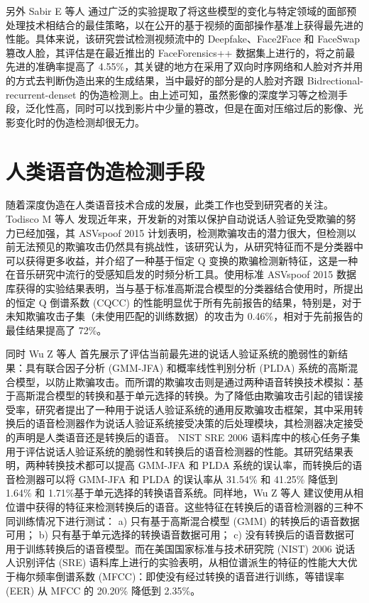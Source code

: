 另外 Sabir E 等人 \cite{sabir2019recurrent} 通过广泛的实验提取了将这些模型的变化与特定领域的面部预处理技术相结合的最佳策略，以在公开的基于视频的面部操作基准上获得最先进的性能。具体来说，该研究尝试检测视频流中的 Deepfake、Face2Face 和 FaceSwap 篡改人脸，其评估是在最近推出的 FaceForensics++ 数据集上进行的，将之前最先进的准确率提高了 4.55\%，其关键的地方在采用了双向时序网络和人脸对齐并用的方式去判断伪造出来的生成结果，当中最好的部分是的人脸对齐跟 Bidrectional-recurrent-denset 的伪造检测上。由上述可知，虽然影像的深度学习等之检测手段，泛化性高，同时可以找到影片中少量的篡改，但是在面对压缩过后的影像、光影变化时的伪造检测却很无力。

\section{人类语音伪造检测手段}

随着深度伪造在人类语音技术合成的发展，此类工作也受到研究者的关注。 Todisco M 等人 \cite{todisco2016new} 发现近年来，开发新的对策以保护自动说话人验证免受欺骗的努力已经加强，其 ASVspoof 2015 计划表明，检测欺骗攻击的潜力很大，但检测以前无法预见的欺骗攻击仍然具有挑战性，该研究认为，从研究特征而不是分类器中可以获得更多收益，并介绍了一种基于恒定 Q 变换的欺骗检测新特征，这是一种在音乐研究中流行的受感知启发的时频分析工具。使用标准 ASVspoof 2015 数据库获得的实验结果表明，当与基于标准高斯混合模型的分类器结合使用时，所提出的恒定 Q 倒谱系数 (CQCC) 的性能明显优于所有先前报告的结果，特别是，对于未知欺骗攻击子集（未使用匹配的训练数据）的攻击为 0.46\%，相对于先前报告的最佳结果提高了 72\%。

同时 Wu Z 等人 \cite{wu2012study} 首先展示了评估当前最先进的说话人验证系统的脆弱性的新结果：具有联合因子分析 (GMM-JFA) 和概率线性判别分析 (PLDA) 系统的高斯混合模型，以防止欺骗攻击。而所谓的欺骗攻击则是通过两种语音转换技术模拟：基于高斯混合模型的转换和基于单元选择的转换。为了降低由欺骗攻击引起的错误接受率，研究者提出了一种用于说话人验证系统的通用反欺骗攻击框架，其中采用转换后的语音检测器作为说话人验证系统接受决策的后处理模块，其检测器决定接受的声明是人类语音还是转换后的语音。 NIST SRE 2006 语料库中的核心任务子集用于评估说话人验证系统的脆弱性和转换后的语音检测器的性能。其研究结果表明，两种转换技术都可以提高 GMM-JFA 和 PLDA 系统的误认率，而转换后的语音检测器可以将 GMM-JFA 和 PLDA 的误认率从 31.54\% 和 41.25\% 降低到 1.64\% 和 1.71\%基于单元选择的转换语音系统。同样地，Wu Z 等人 \cite{wu2012detecting} 建议使用从相位谱中获得的特征来检测转换后的语音。这些特征在转换后的语音检测器的三种不同训练情况下进行测试： a) 只有基于高斯混合模型 (GMM) 的转换后的语音数据可用； b) 只有基于单元选择的转换语音数据可用； c) 没有转换后的语音数据可用于训练转换后的语音模型。而在美国国家标准与技术研究院 (NIST) 2006 说话人识别评估 (SRE) 语料库上进行的实验表明，从相位谱派生的特征的性能大大优于梅尔频率倒谱系数 (MFCC)：即使没有经过转换的语音进行训练，等错误率 (EER) 从 MFCC 的 20.20\% 降低到 2.35\%。

